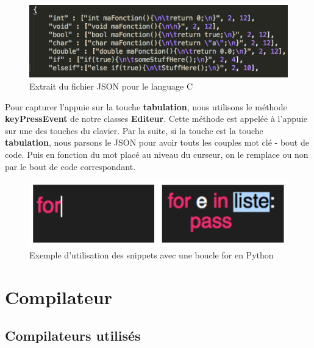 \documentclass[a4paper,12pt]{article}
\begin{document}
			\begin{figure}[h!]
				\begin{center}
					\includegraphics[scale=1]{imgs/exempleJSON}
					\caption{Extrait du fichier JSON pour le language C}
				\end{center}
			\end{figure}


			Pour capturer l'appuie sur la touche \textbf{tabulation}, nous utilisons le méthode \textbf{keyPressEvent} de notre classes \textbf{Editeur}. Cette méthode est appelée à l'appuie sur une des touches du clavier. Par la suite, si la touche est la touche \textbf{tabulation}, nous parsons le JSON pour avoir touts les couples mot clé - bout de code. Puis en fonction du mot placé au niveau du curseur, on le remplace ou non par le bout de code correspondant.

			\begin{figure}[h!]
				\begin{center}
					\includegraphics[scale=0.7]{imgs/exampleFor}
					\caption{Exemple d'utilisation des snippets avec une boucle for en Python}
				\end{center}
			\end{figure}

\section{Compilateur}

	\subsection{Compilateurs utilisés}
\end{document}
